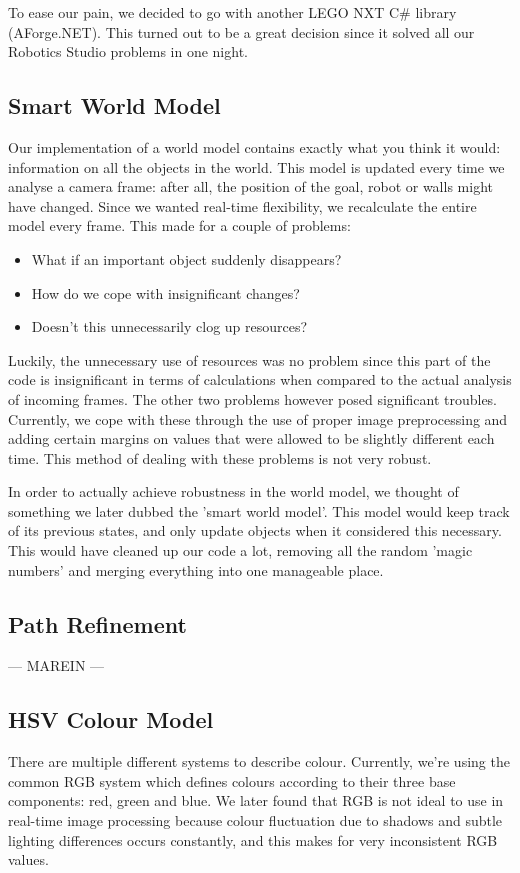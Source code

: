 \documentclass[10pt, abstracton, twocolumn]{scrartcl}
\begin{document}
\begin{appendices}
To ease our pain, we decided to go with another LEGO NXT C\# library (AForge.NET). This turned out to be a great decision since it solved all our Robotics Studio problems in one night.

\subsection{Smart World Model}
Our implementation of a world model contains exactly what you think it would: information on all the objects in the world. This model is updated every time we analyse a camera frame: after all, the position of the goal, robot or walls might have changed. Since we wanted real-time flexibility, we recalculate the entire model every frame. This made for a couple of problems:

\begin{itemize}
\item What if an important object suddenly disappears?
\item How do we cope with insignificant changes?
\item Doesn't this unnecessarily clog up resources?
\end{itemize}

Luckily, the unnecessary use of resources was no problem since this part of the code is insignificant in terms of calculations when compared to the actual analysis of incoming frames. The other two problems however posed significant troubles. Currently, we cope with these through the use of proper image preprocessing and adding certain margins on values that were allowed to be slightly different each time. This method of dealing with these problems is not very robust.

In order to actually achieve robustness in the world model, we thought of something we later dubbed the 'smart world model'. This model would keep track of its previous states, and only update objects when it considered this necessary. This would have cleaned up our code a lot, removing all the random 'magic numbers' and merging everything into one manageable place.

\subsection{Path Refinement}
\label{sec:pathrefinement}
---
MAREIN
---

\subsection{HSV Colour Model}
There are multiple different systems to describe colour. Currently, we're using the common RGB system which defines colours according to their three base components: red, green and blue. We later found that RGB is not ideal to use in real-time image processing because colour fluctuation due to shadows and subtle lighting differences occurs constantly, and this makes for very inconsistent RGB values.


\end{appendices}
\end{document}
